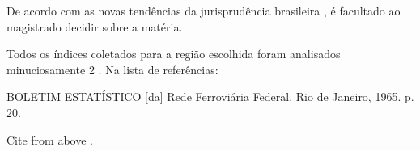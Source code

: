 \documentclass{abntex2}
\begin{document}

De acordo com as novas tendências da jurisprudência brasileira \cite{CRETELLA1992}, é facultado ao
magistrado decidir sobre a matéria.


Todos os índices coletados para a região escolhida foram analisados minuciosamente 2 .
Na lista de referências:

 
BOLETIM ESTATÍSTICO [da] Rede Ferroviária Federal. Rio de
Janeiro, 1965. p. 20.


Cite from above \cite{extra1}.



%


 
\end{document}
